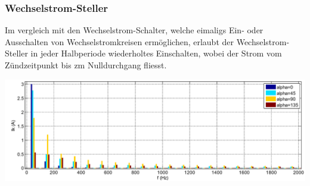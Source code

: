 \subsubsection{Wechselstrom-Steller}
\begin{minipage}{0.5\linewidth}
    Im vergleich mit den Wechselstrom-Schalter, welche eimaligs Ein- oder Ausschalten von Wechselstromkreisen ermöglichen, erlaubt der Wechselstrom-Steller in jeder Halbperiode wiederholtes Einschalten, wobei der Strom vom Zündzeitpunkt bis zm Nulldurchgang fliesst.
\end{minipage}
\begin{minipage}{0.5\linewidth}
    \includegraphics[width=\linewidth]{images/OWWSSteller}
\end{minipage}

